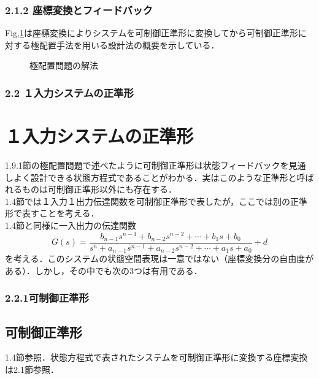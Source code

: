 \begin{frame}[t]
\frametitle{2.1.2 座標変換とフィードバック}

Fig,\ref{fig:poleplace}は座標変換によりシステムを可制御正準形に変換してから可制御正準形に対する極配置手法を用いる設計法の概要を示している．
\begin{figure}
\begin{center}
\scalebox{0.8}{

}
  \caption{極配置問題の解法}
  \label{fig:poleplace}
\end{center}
\end{figure}

\end{frame}

\begin{frame}[t]
\frametitle{2.2 １入力システムの正準形}

\section{１入力システムの正準形}

1.9.1節の極配置問題で述べたように可制御正準形は状態フィードバックを見通しよく設計できる状態方程式であることがわかる．実はこのような正準形と呼ばれるものは可制御正準形以外にも存在する．
\\[3mm]

1.4節では１入力１出力伝達関数を可制御正準形で表したが，ここでは別の正準形で表すことを考える．
\\[3mm]

1.4節と同様に一入出力の伝達関数
\begin{equation}
 G(s) =
  \frac{b_{n-1} s^{n-1} + b_{n-2} s^{n-2} + \cdots + b_1 s + b_0}
  {s^n + a_{n-1} s^{n-1} + a_{n-2} s^{n-2} + \cdots + a_1 s + a_0}
  + d
\end{equation}
を考える．このシステムの状態空間表現は一意ではない（座標変換分の自由度がある）．しかし，その中でも次の3つは有用である．

\end{frame}

\begin{frame}[t]
\frametitle{2.2.1可制御正準形}
\subsection{可制御正準形}

1.4節参照．状態方程式で表されたシステムを可制御正準形に変換する座標変換は2.1節参照．

\end{frame}

